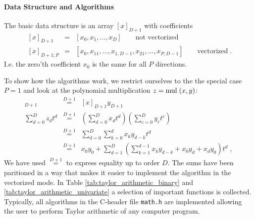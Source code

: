 \documentclass[a4paper,12pt,twoside]{article}
\begin{document}
\paragraph{Data Structure and Algorithms}
The basic data structure is an array $[x]_{D+1}$ with coefficients
\begin{eqnarray*}
\;[x]_{D+1} &=& [x_0, x_1, \dots, x_D] \quad \quad \mbox{not vectorized} \\
\;[x]_{D+1; P} &=& [x_0, x_{11}, \dots, x_{1,D-1}, x_{21}, \dots, x_{P,D-1}] \quad \quad \mbox{vectorized} \;.
\end{eqnarray*}
I.e. the zero'th coefficient $x_0$ is the same for all $P$ directions.

To show how the algorithms work, we restrict ourselves to the the special case $P=1$ and look at the polynomial multiplication $z = \mathrm{mul}\;(x,y)$:
\begin{eqnarray}
[z]_{D+1} &\stackrel{D+1}{=}& [x]_{D+1} y_{D+1} \\
\sum_{d=0}^D z_d t^d &\stackrel{D+1}{=}& \left( \sum_{d=0}^D x_d t^d \right) \left( \sum_{c=0}^D y_c t^c \right)   \\
&\stackrel{D+1}{=}& \sum_{d=0}^D \sum_{k=0}^d x_k y_{d-k} t^d \\
&\stackrel{D+1}{=}& x_0 y_0 + \sum_{d=1}^D \left( \sum_{k=1}^{d-1} x_k y_{d-k} + x_0 y_d + x_d y_0 \right)  t^d \;,
\end{eqnarray}
We have used $\stackrel{D+1}{=}$ to express equality up to order $D$. The sums have been paritioned in a way that makes it easier to implement the algorithm in the vectorized mode. In Table \ref{tab:taylor_arithmetic_binary} and \ref{tab:taylor_arithmetic_univariate} a selection of important functions is collected. Typically, all algorithms in the C-header file \texttt{math.h} are implemented allowing the user to perform Taylor arithmetic of any computer program.
\end{document}
